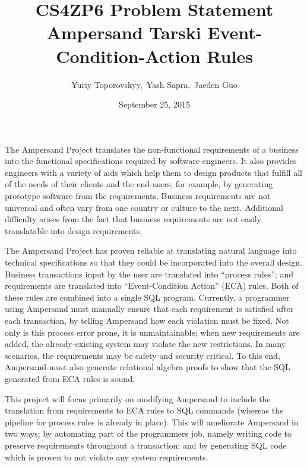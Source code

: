 \documentclass[12pt]{article}
\begin{document}
\title{CS4ZP6 Problem Statement \\ Ampersand Tarski Event-Condition-Action Rules } 
\author{Yuriy Toporovskyy,\ Yash Sapra,\ Jaeden Guo}
\date{September 25, 2015}
\thispagestyle{empty}
\maketitle


The Ampersand Project translates the non-functional requirements of a
business into the functional specifications required by software engineers. It
also provides engineers with a variety of aids which help them to design
products that fulfill all of the needs of their clients and the end-users; for
example, by generating prototype software from the requirements.
Business requirements are not universal and often vary from one country or
culture to the next. Additional difficulty arises from the fact that business
requirements are not easily translatable into design requirements. 

The Ampersand Project has proven reliable at translating natural
language into technical specifications so that they could be incorporated into
the overall design. Business transactions input by the user are translated into
``process rules''; and requirements are translated into ``Event-Condition
Action'' (ECA) rules. Both of these rules are combined into a single SQL
program. Currently, a programmer using Ampersand must manually ensure that each
requirement is satisfied after each transaction, by telling Ampersand how each
violation must be fixed. Not only is this process error prone, it is
unmaintainable; when new requirements are added, the already-existing system may
violate the new restrictions. In many scenarios, the requirements may be safety
and security critical. To this end, Ampersand must also generate relational
algebra proofs to show that the SQL generated from ECA rules is sound. 

This project will focus primarily on modifying Ampersand to include the
translation from requirements to ECA rules to SQL commands (whereas the pipeline
for process rules is already in place). This will ameliorate Ampersand in two
ways; by automating part of the programmers job, namely writing code to preserve
requirements throughout a transaction; and by generating SQL code which is
proven to not violate any system requirements. 
\end{document}
